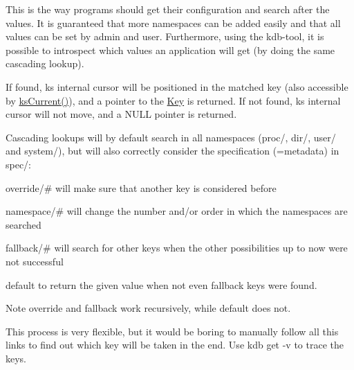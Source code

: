  This is the way programs should get their configuration and search after the values. It is guaranteed that more namespaces can be added easily and that all values can be set by admin and user. Furthermore, using the kdb-\/tool, it is possible to introspect which values an application will get (by doing the same cascading lookup).

If found, {\ttfamily ks} internal cursor will be positioned in the matched key (also accessible by \hyperlink{group__keyset_ga4287b9416912c5f2ab9c195cb74fb094}{ks\+Current()}), and a pointer to the \hyperlink{classkdb_1_1Key}{Key} is returned. If not found, {\ttfamily ks} internal cursor will not move, and a N\+U\+LL pointer is returned.

Cascading lookups will by default search in all namespaces (proc/, dir/, user/ and system/), but will also correctly consider the specification (=metadata) in spec/\+:


\begin{DoxyItemize}
\item {\ttfamily override/\#} will make sure that another key is considered before
\item {\ttfamily namespace/\#} will change the number and/or order in which the namespaces are searched
\item {\ttfamily fallback/\#} will search for other keys when the other possibilities up to now were not successful
\item {\ttfamily default} to return the given value when not even {\ttfamily fallback} keys were found.
\end{DoxyItemize}

\begin{DoxyNote}{Note}
override and fallback work recursively, while default does not.
\end{DoxyNote}
This process is very flexible, but it would be boring to manually follow all this links to find out which key will be taken in the end. Use {\ttfamily kdb get -\/v} to trace the keys.

